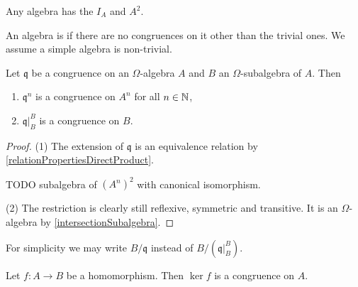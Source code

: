 \begin{example}
Any algebra has the  $I_A$ and $A^2$.
\end{example}

An algebra is  if there are no congruences on it other than the trivial ones. We assume a simple algebra is non-trivial.

\begin{lemma} \label{basicCongruenceLemma}
Let $\mathfrak{q}$ be a congruence on an $\Omega$-algebra $A$ and $B$ an $\Omega$-subalgebra of $A$. Then
\begin{enumerate}
\item $\mathfrak{q}^n$ is a congruence on $A^n$ for all $n\in \mathbb{N}$,
\item $\mathfrak{q}|_B^B$ is a congruence on $B$.
\end{enumerate}
\end{lemma}
\begin{proof}
(1) The extension of $\mathfrak{q}$ is an equivalence relation by \ref{relationPropertiesDirectProduct}.

TODO subalgebra of $(A^n)^2$ with canonical isomorphism.

(2) The restriction is clearly still reflexive, symmetric and transitive. It is an $\Omega$-algebra by \ref{intersectionSubalgebra}.
\end{proof}
For simplicity we may write $B/\mathfrak{q}$ instead of $B/(\mathfrak{q}|_B^B)$.

\begin{proposition} \label{kernelCongruence}
Let $f:A\to B$ be a homomorphism. Then $\ker f$ is a congruence on $A$.
\end{proposition}

